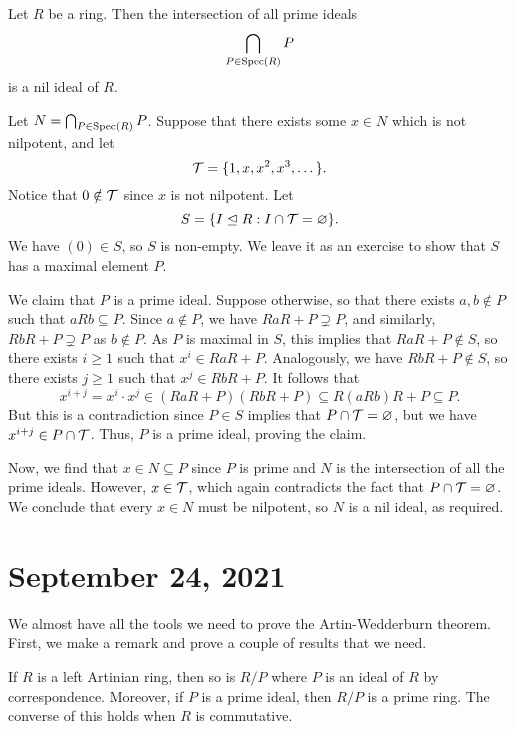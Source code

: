 \begin{theo}{}
Let $R$ be a ring. Then the intersection of all prime ideals 
\[ \bigcap_{P \in \operatorname{Spec}(R)} P \]
is a nil ideal of $R$. 
\end{theo}
\begin{pf}
Let $N = \bigcap_{P \in \operatorname{Spec}(R)} P$. Suppose that there exists some $x \in N$ which is not nilpotent,
and let 
\[ {\cal T} = \{1, x, x^2, x^3, \dots \}. \]
Notice that $0 \notin {\cal T}$ since $x$ is not nilpotent. Let 
\[ S = \{I \trianglelefteq R : I \cap {\cal T} = \varnothing\}. \]
We have $(0) \in S$, so $S$ is non-empty. We leave it as an exercise to show that $S$ has a maximal 
element $P$. 

We claim that $P$ is a prime ideal. Suppose otherwise, so that there exists $a, b \notin P$ 
such that $aRb \subseteq P$. Since $a \notin P$, we have $RaR + P \supsetneq P$, and similarly, 
$RbR + P \supsetneq P$ as $b \notin P$. As $P$ is maximal in $S$, this implies that 
$RaR + P \notin S$, so there exists $i \geq 1$ such that $x^i \in RaR + P$. 
Analogously, we have $RbR + P \notin S$, so there exists $j \geq 1$ such that $x^j \in RbR + P$. 
It follows that 
\[ x^{i+j} = x^i \cdot x^j \in (RaR + P)(RbR + P) \subseteq R(aRb)R + P \subseteq P. \]
But this is a contradiction since $P \in S$ implies that 
$P \cap {\cal T} = \varnothing$, but we have $x^{i+j} \in P \cap {\cal T}$. 
Thus, $P$ is a prime ideal, proving the claim. 

Now, we find that $x \in N \subseteq P$ since $P$ is prime and $N$ is the intersection of all 
the prime ideals. However, $x \in {\cal T}$, which again contradicts the fact that 
$P \cap {\cal T} = \varnothing$. We conclude that every $x \in N$ must be nilpotent, so 
$N$ is a nil ideal, as required.
\end{pf}

\section{September 24, 2021}
We almost have all the tools we need to prove the Artin-Wedderburn theorem. 
First, we make a remark and prove a couple of results that we need. 

\begin{remark}{}
If $R$ is a left Artinian ring, then so is $R/P$ where $P$ is an ideal of $R$ by correspondence. 
Moreover, if $P$ is a prime ideal, then $R/P$ is a prime ring. The converse of this holds when 
$R$ is commutative. 
\end{remark}

